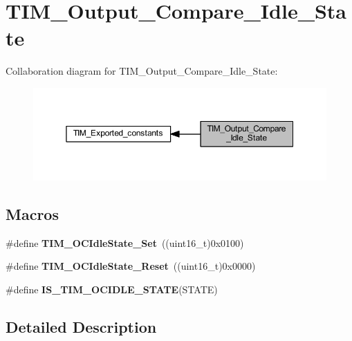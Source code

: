 \hypertarget{group___t_i_m___output___compare___idle___state}{}\section{T\+I\+M\+\_\+\+Output\+\_\+\+Compare\+\_\+\+Idle\+\_\+\+State}
\label{group___t_i_m___output___compare___idle___state}
Collaboration diagram for T\+I\+M\+\_\+\+Output\+\_\+\+Compare\+\_\+\+Idle\+\_\+\+State\+:\nopagebreak
\begin{figure}[H]
\begin{center}
\leavevmode
\includegraphics[width=350pt]{group___t_i_m___output___compare___idle___state}
\end{center}
\end{figure}
\subsection*{Macros}
\begin{DoxyCompactItemize}
\item 
\mbox{\label{group___t_i_m___output___compare___idle___state_ga86d8f895a1ec584323f6c02c7edfad4c}} 
\#define {\bfseries T\+I\+M\+\_\+\+O\+C\+Idle\+State\+\_\+\+Set}~((uint16\+\_\+t)0x0100)
\item 
\mbox{\label{group___t_i_m___output___compare___idle___state_gace5465bc9e90ba7862b3af9e6cc9b97e}} 
\#define {\bfseries T\+I\+M\+\_\+\+O\+C\+Idle\+State\+\_\+\+Reset}~((uint16\+\_\+t)0x0000)
\item 
\#define {\bfseries I\+S\+\_\+\+T\+I\+M\+\_\+\+O\+C\+I\+D\+L\+E\+\_\+\+S\+T\+A\+TE}(S\+T\+A\+TE)
\end{DoxyCompactItemize}


\subsection{Detailed Description}


